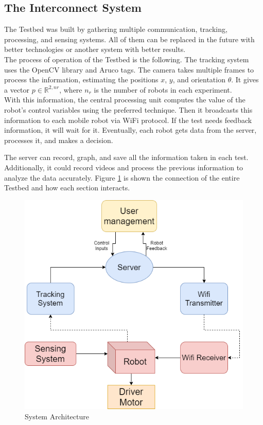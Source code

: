 \subsection{The Interconnect System}

The Testbed was built by gathering multiple communication, tracking, processing, and sensing systems. All of them can be replaced in the future with better technologies or another system with better results.
\\

The process of operation of the Testbed is the following. The tracking system uses the OpenCV library and Aruco tags. The camera takes multiple frames to process the information, estimating the positions $x$, $y$, and orientation $\theta$. It gives a vector $p \in \mathbb{R}^{2,nr}$, where $n_{r}$ is the number of robots in each experiment.
\\

With this information, the central processing unit computes the value of the robot's control variables using the preferred technique. Then it broadcasts this information to each mobile robot via WiFi protocol. If the test needs feedback information, it will wait for it. Eventually, each robot gets data from the server, processes it, and makes a decision. 

The server can record, graph, and save all the information taken in each test. Additionally, it could record videos and process the previous information to analyze the data accurately. Figure \ref{diagram} is shown the connection of the entire Testbed and how each section interacts.

\begin{figure}[!h]
\begin{center}
    \includegraphics[width=13 cm]{Kap3/TestbedDiagram.png}
    \caption{System Architecture}
    \label{diagram}
\end{center}
\end{figure}







